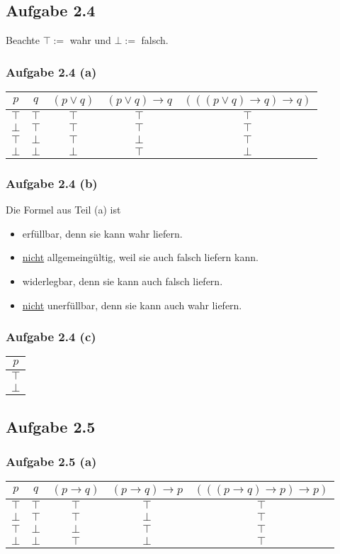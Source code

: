 \subsection{Aufgabe 2.4}
Beachte $\top:=$ wahr und $\bot:=$ falsch.

\subsubsection{Aufgabe 2.4 (a)}
\begin{tabular}{c|c||c|c|c}
	$p$ & $q$ & $(p\vee q)$ & $(p\vee q)\to q$ & $(((p\vee q)\to q)\to q)$\\ \hline
	$\top$ & $\top$ & $\top$ & $\top$ & $\top$\\
	$\bot$ & $\top$ & $\top$ & $\top$ & $\top$\\
	$\top$ & $\bot$ & $\top$ & $\bot$ & $\top$\\
	$\bot$ & $\bot$ & $\bot$ & $\top$ & $\bot$
\end{tabular}

\subsubsection{Aufgabe 2.4 (b)}
Die Formel aus Teil (a) ist
\begin{itemize}
	\item erfüllbar, denn sie kann wahr liefern.
	\item \underline{nicht} allgemeingültig, weil sie auch falsch liefern kann.
	\item widerlegbar, denn sie kann auch falsch liefern.
	\item \underline{nicht} unerfüllbar, denn sie kann auch wahr liefern.
\end{itemize}

\subsubsection{Aufgabe 2.4 (c)}
\begin{tabular}{c}
	$p$\\ \hline
	$\top$\\
	$\bot$
\end{tabular}

\subsection{Aufgabe 2.5}
\subsubsection{Aufgabe 2.5 (a)}
\begin{tabular}{c|c||c|c|c}
	$p$ & $q$ & $(p\to q)$ & $(p\to q)\to p$ & $(((p\to q)\to p)\to p)$\\ \hline
	$\top$ & $\top$ & $\top$ & $\top$ & $\top$ \\
	$\bot$ & $\top$ & $\top$ & $\bot$ & $\top$ \\
	$\top$ & $\bot$ & $\bot$ & $\top$ & $\top$\\
	$\bot$ & $\bot$ & $\top$ & $\bot$ & $\top$\\
\end{tabular}

